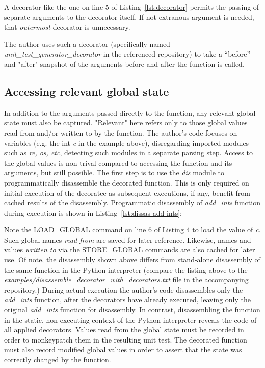 A decorator like the one on line 5 of Listing~\ref{lst:decorator} permits
the passing of separate arguments to the decorator itself.  
If not extranous argument is needed, that \textit{outermost} decorator
is unnecessary.

The author uses such a decorator (specifically named 
\break
\textit{unit\_test\_generator\_decorator} in the referenced repository) to take
 a “before” and "after" snapshot of the arguments
before and after the function is called.

%
\subsection{Accessing relevant global state}\label{sec:approach-internal-2}

In addition to the arguments passed directly to the function, any relevant 
global state must also be captured. "Relevant" here refers only to those 
global values read from and/or written to by the function.
The author's code focuses on variables (e.g. the int \textit{c} in the example above), 
disregarding imported modules such as \textit{re, os, etc}, detecting such
modules in a separate parsing step.
Access to the global values is non-trival compared to accessing the function 
and its arguments, but still possible.  The first step is to use the \textit{dis}
module to programmatically disassemble the decorated function.  This is only 
required on initial execution of the decoratee as subsequent executions, if any, 
benefit from cached results of the disassembly.
Programmatic disassembly of \textit{add\_ints} function during execution is shown
in Listing~\ref{lst:dissas-add-ints}:



Note the LOAD\_GLOBAL command on line 6 of Listing 4 to load the value of 
\textit{c}.  Such global names \textit{read from} are saved for later reference.  
Likewise, names and values \textit{written to} via 
the STORE\_GLOBAL commands are also cached for later use.
%
Of note, the disassembly shown above differs from stand-alone disassembly of 
the same function in the Python interpreter (compare the listing above to the
\textit{examples/disassemble\_decorator\_with\_decorators.txt} file in the 
accompanying repository.)
During actual execution the author's code disassembles only the
\textit{add\_ints} function, after the decorators
have already executed, leaving only the original  \textit{add\_ints}
function for disassembly.
In contrast, disassembling the function in the static, non-executing context of
the Python interpreter reveals the code of all applied decorators.  
%
Values read from the global state must be recorded 
in order to monkeypatch them in the resulting unit test.
%
The decorated function must also record modified global values in
order to assert that the state was correctly changed by the function.

